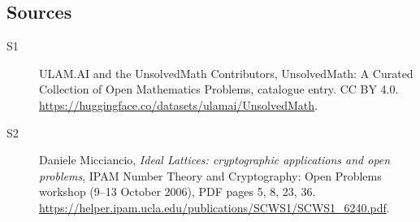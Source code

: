 \documentclass[11pt]{article}
\begin{document}
\subsection{Sources}
\begin{description}
\item[\hypertarget{source:statement:1}{S1}] ULAM.AI and the UnsolvedMath Contributors, UnsolvedMath: A Curated Collection of Open Mathematics Problems, catalogue entry. CC BY 4.0. \url{https://huggingface.co/datasets/ulamai/UnsolvedMath}.
\item[\hypertarget{source:statement:2}{S2}] Daniele Micciancio, \emph{Ideal Lattices: cryptographic applications and open problems}, IPAM Number Theory and Cryptography: Open Problems workshop (9--13 October 2006), PDF pages 5, 8, 23, 36. \url{https://helper.ipam.ucla.edu/publications/SCWS1/SCWS1_6240.pdf}.
\end{description}
\label{end:statement}
\end{document}
